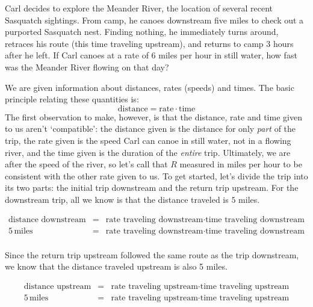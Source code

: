 \documentclass{ximera}
\begin{document}
\begin{example}  \label{upstreamdownstreamex}  Carl decides to explore the Meander River, the location of several recent Sasquatch sightings.  From camp, he canoes downstream five miles to check out a purported Sasquatch nest.  Finding nothing, he immediately turns around, retraces his route (this time traveling upstream), and returns to camp 3 hours after he left.  If Carl canoes at a rate  of 6 miles per hour in still water, how fast was the Meander River flowing on that day?


\begin{explanation}
 We are given information about distances, rates (speeds) and times.  The basic principle relating these quantities is: \[ \text{distance} = \text{rate} \cdot \text{time}\]  The first observation to make, however, is that the distance, rate and time given to us aren't `compatible':  the distance given is the distance for only \textit{part} of the trip,  the rate given is the speed Carl can canoe in still water, not in a flowing river, and  the time given is the duration of the \textit{entire} trip.  Ultimately, we are after the speed of the river, so let's call that $R$ measured in miles per hour to be consistent with the other rate given to us.  To get started, let's divide the trip into its two parts:  the initial trip downstream and the return trip upstream.  For the downstream trip, all we know is that the distance traveled is $5$ miles.

\[ \begin{array}{rcl}

\text{distance downstream} & = & \text{rate traveling downstream} \cdot \text{time traveling downstream} \\

5 \, \text{miles} & = & \text{rate traveling downstream} \cdot \text{time traveling downstream} \\ \end{array} \]

Since the return trip upstream followed the same route as the trip downstream, we know that the distance traveled upstream is also 5 miles.

\[ \begin{array}{rcl}

\text{distance upstream} & = & \text{rate traveling upstream} \cdot \text{time traveling upstream} \\

5 \, \text{miles} & = & \text{rate traveling upstream} \cdot \text{time traveling upstream} \\ \end{array} \]


\end{explanation}
\end{example}
\end{document}

